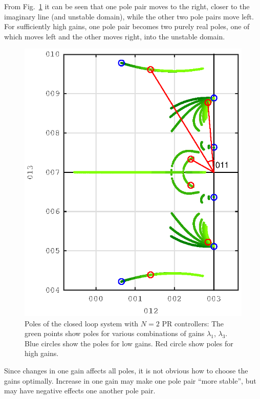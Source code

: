 \documentclass[conference,10pt]{IEEEtran}
\begin{document}
From Fig.~\ref{fig:PoleExample} it can be seen that one pole pair moves to the right, closer to the imaginary line (and unstable domain), while the other two pole pairs move left. For sufficiently high gains, one pole pair becomes two purely real poles, one of which moves left and the other moves right, into the unstable domain.
\begin{figure}[!h]
\centering

\includegraphics{fig/root_locus_2D}
\caption{Poles of the closed loop system with $N=2$ PR controllers: The green points show poles for various combinations of gains $\lambda_1$,
$\lambda_3$. Blue circles show the poles for low gains. Red circle show poles for high gains. }
\label{fig:PoleExample}
\end{figure}



Since changes in one gain affects all poles, it is not obvious how to choose the gains optimally. Increase in one gain may make one pole pair ``more stable'', but may have negative effects one another pole pair.
\end{document}
